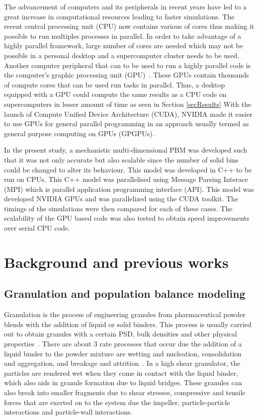 \documentclass[preprint,10pt,authoryear,review]{elsarticle}
\begin{document}
\begin{linenumbers}
The advancement of computers and its peripherals in recent years have led to a great increase in 
computational resources leading to faster simulations. The recent central processing unit (CPU) 
now contains various of cores thus making it possible to run multiples processes in parallel. 
In order to take advantage of a highly parallel framework, large number of cores are needed 
which may not be possible in a personal desktop and a supercomputer cluster needs to be used.
Another computer peripheral that can to be used to run a highly parallel code is the computer's 
graphic processing unit (GPU)~\citep{Prakash2013b}. These GPUs contain thousands of compute 
cores that can be used run tasks in parallel. Thus, a desktop equipped with a GPU could 
compute the same results as a CPU code on supercomputers in lesser amount of time as seen in Section \ref{secResults}
With the launch of Compute Unified Device Architecture (CUDA), NVIDIA made it easier to use GPUs for 
general parallel programming in an approach usually termed as general purpose computing on GPUs (GPGPUs).

In the present study, a mechanistic multi-dimensional PBM was developed such that it was not 
only accurate but also scalable since the number of solid bins could be changed to alter its 
behaviour. This model was developed in C++ to be run on CPUs. This C++ model was parallelised 
using Message Parsing Interace (MPI) which is parallel application programming interface (API). 
This model was developed NVIDIA GPUs and was parallelized using the CUDA toolkit. The timings of 
the simulations were then compared for each of these cases. The scalability of the GPU based code 
was also tested to obtain speed improvements over serial CPU code.


\section{Background and previous works}
\label{secBkgd}
\subsection{Granulation and population balance modeling}
Granulation is the process of engineering granules from pharmaceutical powder blends 
with the addition of liquid or solid binders. This process is usually carried out 
to obtain granules with a certain PSD,  bulk densities and other physical properties~\citep{Barrasso2015cerd}.
There are about 3 rate processes that occur due the addition of a liquid binder to the 
powder mixture are wetting and nucleation, consolidation and aggregation, and breakage 
and attrition~\citep{sen2014}. In a high shear granulator, the particles are rendered wet 
when they come in contact with the liquid binder, which also aids in granule formation due to 
liquid bridges. These granules can also break into smaller fragments due to shear stresses, 
compressive and tensile forces that are exerted on to the system due the impeller, 
particle-particle interactions and particle-wall interactions.


\end{linenumbers}
\end{document}
